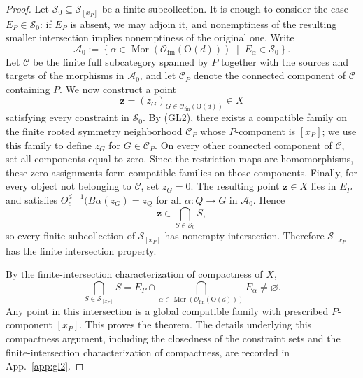 \documentclass[aps,prx,reprint,superscriptaddress,twocolumn,amsmath,amssymb,amsfonts, nofootinbib]{revtex4-2}
\newcommand{\ofin}{\mathcal{O}_{\text{fin}}}
\theoremstyle{apsstyle}
\begin{document}
\begin{proof}
Let $\mathcal S_0\subseteq\mathcal S_{[x_P]}$ be a finite subcollection. It is enough to consider the case $E_P\in\mathcal S_0$: if $E_P$ is absent, we may adjoin it, and nonemptiness of the resulting smaller intersection implies nonemptiness of the original one. Write
\begin{equation*}
\mathcal A_0
:=
\left\{
\alpha\in\operatorname{Mor}(\ofin(\mathrm{O}(d)))
\;\middle|\;
E_\alpha\in\mathcal S_0
\right\}.
\end{equation*}
Let $\mathcal C$ be the finite full subcategory spanned by $P$ together with the sources and targets of the morphisms in $\mathcal A_0$, and let $\mathcal C_P$ denote the connected component of $\mathcal C$ containing $P$. We now construct a point
\begin{equation*}
\mathbf z=(z_G)_{G\in\ofin(\mathrm{O}(d))}\in X
\end{equation*}
satisfying every constraint in $\mathcal S_0$. By {\rm(GL2)}, there exists a compatible family on the finite rooted symmetry neighborhood $\mathcal C_P$ whose $P$-component is $[x_P]$; we use this family to define $z_G$ for $G\in\mathcal C_P$. On every other connected component of $\mathcal C$, set all components equal to zero. Since the restriction maps are homomorphisms, these zero assignments form compatible families on those components. Finally, for every object not belonging to $\mathcal C$, set $z_G=0$. The resulting point $\mathbf z\in X$ lies in $E_P$ and satisfies $\Theta^{d+1}_{c}(B\alpha (z_G)=z_Q$ for all $\alpha:Q\to G$ in $\mathcal A_0$. Hence
\begin{equation*}
\mathbf z\in\bigcap_{S\in\mathcal S_0}S,
\end{equation*}
so every finite subcollection of $\mathcal S_{[x_P]}$ has nonempty intersection. Therefore $\mathcal S_{[x_P]}$ has the finite intersection property.

\bigskip 

\noindent By the finite-intersection characterization of compactness of $X$,
\begin{equation*}
\bigcap_{S\in\mathcal S_{[x_P]}}S = E_P\cap
\bigcap_{\alpha\in\operatorname{Mor}(\ofin(\mathrm{O}(d)))}E_\alpha \neq\varnothing.
\end{equation*}
Any point in this intersection is a global compatible family with prescribed $P$-component $[x_P]$. This proves the theorem. The details underlying this compactness argument, including the closedness of the constraint sets and the finite-intersection characterization of compactness, are recorded in App.~\ref{app:gl2}.
\end{proof}
\end{document}
